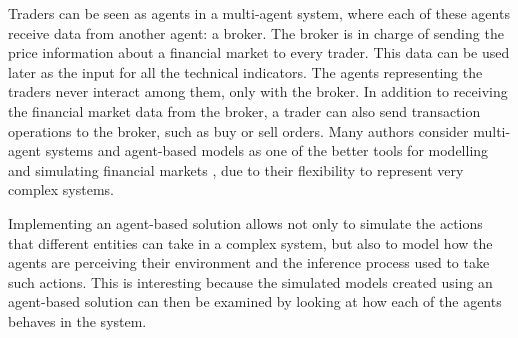 Traders can be seen as agents in a multi-agent system, where each of these
agents receive data from another agent: a broker. The broker is in charge of
sending the price information about a financial market to every trader. This
data can be used later as the input for all the technical indicators. The agents
representing the traders never interact among them, only with the broker. In
addition to receiving the financial market data from the broker, a trader can
also send transaction operations to the broker, such as buy or sell orders. Many
authors consider multi-agent systems and agent-based models as one of the better
tools for modelling and simulating financial markets \cite{Lebaron2001}
\cite{Gamil2007} \cite{Boer-Sorban2008}, due to their flexibility to represent
very complex systems. %

Implementing an agent-based solution allows not only to simulate the actions
that different entities can take in a complex system, but also to model how the
agents are perceiving their environment and the inference process used to take
such actions. This is interesting because the simulated models created using an
agent-based solution can then be examined by looking at how each of the agents
behaves in the system.



